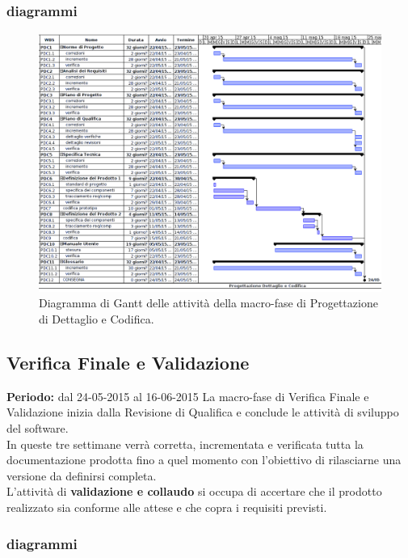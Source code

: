 \newpage
\subsubsection{diagrammi}

\begin{figure}[h]
\begin{center}
\includegraphics[width=\textwidth, height=\textheight, keepaspectratio]{img/progdet-gantt.png}
\caption{Diagramma di Gantt delle attività della macro-fase di Progettazione di Dettaglio e Codifica.}
\end{center}
\end{figure}
\clearpage


\subsection{Verifica Finale e Validazione}
\textbf{Periodo:} dal 24-05-2015 al 16-06-2015 
La macro-fase di Verifica Finale e Validazione inizia dalla Revisione di Qualifica e conclude le attività di sviluppo del software. \\
In queste tre settimane verrà corretta, incrementata e verificata tutta la documentazione prodotta fino a quel momento con l'obiettivo di rilasciarne una versione da definirsi completa. \\
L'attività di \textbf{validazione e collaudo} si occupa di accertare che il prodotto realizzato sia conforme alle attese e che copra i requisiti previsti. \\

\newpage
\subsubsection{diagrammi}

